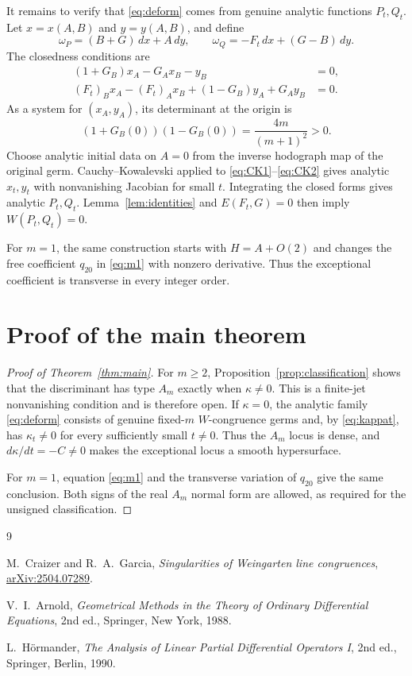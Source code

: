 \documentclass[11pt]{article}
\theoremstyle{remark}
\begin{document}
It remains to verify that \eqref{eq:deform} comes from genuine analytic
functions $P_t,Q_t$.  Let $x=x(A,B)$ and $y=y(A,B)$, and define
\[
 \omega_P=(B+G)\,dx+A\,dy,
 \qquad
 \omega_Q=-F_t\,dx+(G-B)\,dy.
\]
The closedness conditions are
\begin{align}
 (1+G_B)x_A-G_Ax_B-y_B&=0,\label{eq:CK1}\\
 (F_t)_Bx_A-(F_t)_Ax_B+(1-G_B)y_A+G_Ay_B&=0.
 \label{eq:CK2}
\end{align}
As a system for $(x_A,y_A)$, its determinant at the origin is
\begin{equation}\label{eq:det}
 (1+G_B(0))(1-G_B(0))
 =\frac{4m}{(m+1)^2}>0.
\end{equation}
Choose analytic initial data on $A=0$ from the inverse hodograph map of the
original germ.  Cauchy--Kowalevski applied to
\eqref{eq:CK1}--\eqref{eq:CK2} gives analytic $x_t,y_t$ with nonvanishing
Jacobian for small $t$.  Integrating the closed forms gives analytic
$P_t,Q_t$.  Lemma~\ref{lem:identities} and $E(F_t,G)=0$ then imply
$W(P_t,Q_t)=0$.

For $m=1$, the same construction starts with $H=A+O(2)$ and changes the
free coefficient $q_{20}$ in \eqref{eq:m1} with nonzero derivative.
Thus the exceptional coefficient is transverse in every integer order.

\section{Proof of the main theorem}

\begin{proof}[Proof of Theorem~\ref{thm:main}]
For $m\ge2$, Proposition~\ref{prop:classification} shows that the
discriminant has type $A_m$ exactly when $\kappa\ne0$.  This is a
finite-jet nonvanishing condition and is therefore open.  If $\kappa=0$,
the analytic family \eqref{eq:deform} consists of genuine fixed-$m$
$W$-congruence germs and, by \eqref{eq:kappat}, has $\kappa_t\ne0$ for
every sufficiently small $t\ne0$.  Thus the $A_m$ locus is dense, and
$d\kappa/dt=-C\ne0$ makes the exceptional locus a smooth hypersurface.

For $m=1$, equation \eqref{eq:m1} and the transverse variation of $q_{20}$
give the same conclusion.  Both signs of the real $A_m$ normal form are
allowed, as required for the unsigned classification.
\end{proof}

\begin{thebibliography}{9}

M.~Craizer and R.~A.~Garcia,
\emph{Singularities of Weingarten line congruences},
\href{https://arxiv.org/abs/2504.07289}{arXiv:2504.07289}.

V.~I.~Arnold,
\emph{Geometrical Methods in the Theory of Ordinary Differential Equations},
2nd ed., Springer, New York, 1988.

L.~H\"ormander,
\emph{The Analysis of Linear Partial Differential Operators I},
2nd ed., Springer, Berlin, 1990.

\end{thebibliography}
\end{document}
